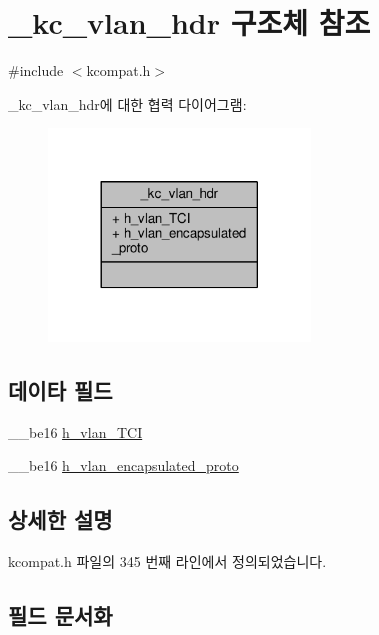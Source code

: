 \hypertarget{struct__kc__vlan__hdr}{}\section{\+\_\+kc\+\_\+vlan\+\_\+hdr 구조체 참조}
\label{struct__kc__vlan__hdr}


{\ttfamily \#include $<$kcompat.\+h$>$}



\+\_\+kc\+\_\+vlan\+\_\+hdr에 대한 협력 다이어그램\+:
\nopagebreak
\begin{figure}[H]
\begin{center}
\leavevmode
\includegraphics[width=197pt]{struct__kc__vlan__hdr__coll__graph}
\end{center}
\end{figure}
\subsection*{데이타 필드}
\begin{DoxyCompactItemize}
\item 
\+\_\+\+\_\+be16 \hyperlink{struct__kc__vlan__hdr_aa70cf4362df675d9268e3dd238060f29}{h\+\_\+vlan\+\_\+\+T\+CI}
\item 
\+\_\+\+\_\+be16 \hyperlink{struct__kc__vlan__hdr_a36530e176eb1042729f476437cde0790}{h\+\_\+vlan\+\_\+encapsulated\+\_\+proto}
\end{DoxyCompactItemize}


\subsection{상세한 설명}


kcompat.\+h 파일의 345 번째 라인에서 정의되었습니다.



\subsection{필드 문서화}
